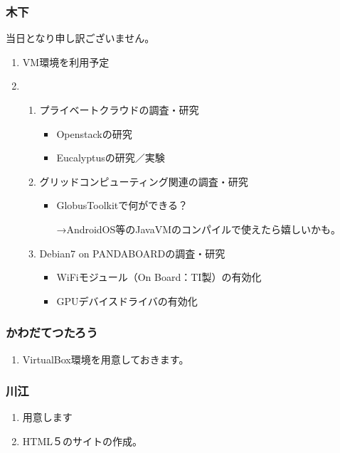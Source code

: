 \documentclass[cjk,dvipdfmx,10pt,compress,%
hyperref={bookmarks=true,bookmarksnumbered=true,bookmarksopen=false,%
colorlinks=false,%
pdftitle={第 91 回 関西 Debian 勉強会},%
pdfauthor={倉敷・のがた・佐々木・かわだ},%
pdfsubject={資料},%
}]{beamer}
\begin{document}
\begin{frame}
  \frametitle{ 木下 }

  当日となり申し訳ございません。

  \begin{enumerate}
  \item VM環境を利用予定

  \item
    \begin{enumerate}
    \item プライベートクラウドの調査・研究
      \begin{itemize}
      \item Openstackの研究
      \item Eucalyptusの研究／実験
      \end{itemize}

    \item グリッドコンピューティング関連の調査・研究
      \begin{itemize}
      \item GlobusToolkitで何ができる？

        →AndroidOS等のJavaVMのコンパイルで使えたら嬉しいかも。
      \end{itemize}

    \item Debian7 on PANDABOARDの調査・研究
      \begin{itemize}
      \item WiFiモジュール（On Board：TI製）の有効化
      \item GPUデバイスドライバの有効化
      \end{itemize}
    \end{enumerate}
  \end{enumerate}
\end{frame}

\begin{frame}
  \frametitle{ かわだてつたろう }
  \begin{enumerate}
  \item VirtualBox環境を用意しておきます。
  \end{enumerate}
\end{frame}

\begin{frame}
  \frametitle{ 川江 }
  \begin{enumerate}
  \item 用意します 
  \item HTML５のサイトの作成。
  \end{enumerate}
\end{frame}
\end{document}
